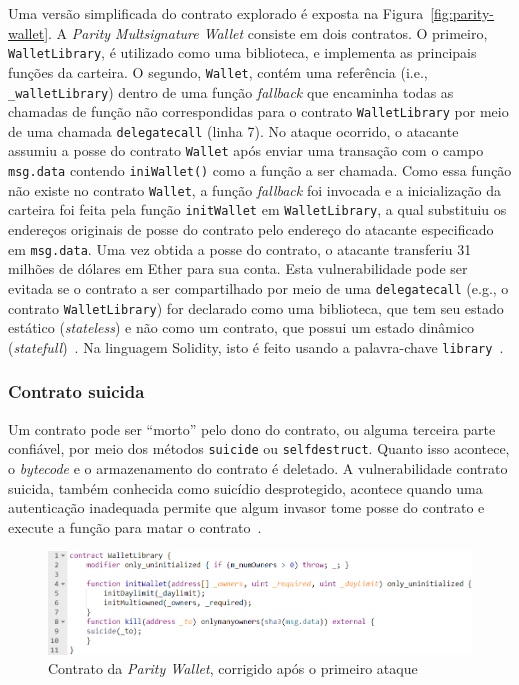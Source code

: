 Uma versão simplificada do contrato explorado é exposta na Figura~\ref{fig:parity-wallet}. A \textit{Parity Multsignature Wallet} consiste em dois contratos. O primeiro, \texttt{WalletLibrary}, é utilizado como uma biblioteca, e implementa as principais funções da carteira. O segundo, \texttt{Wallet}, contém uma referência (i.e., \texttt{\_walletLibrary}) dentro de uma função \textit{fallback} que encaminha todas as chamadas de função não correspondidas para o contrato \texttt{WalletLibrary} por meio de uma chamada \texttt{delegatecall} (linha 7). No ataque ocorrido, o atacante assumiu a posse do contrato \texttt{Wallet} após enviar uma transação com o campo \texttt{msg.data} contendo \texttt{iniWallet()} como a função a ser chamada. Como essa função não existe no contrato \texttt{Wallet}, a função \textit{fallback} foi invocada e a inicialização da carteira foi feita pela função \texttt{initWallet} em \texttt{WalletLibrary}, a qual substituiu os endereços originais de posse do contrato pelo endereço do atacante especificado em \texttt{msg.data}. Uma vez obtida a posse do contrato, o atacante transferiu 31 milhões de dólares em Ether para sua conta. Esta vulnerabilidade pode ser evitada se o contrato a ser compartilhado por meio de uma \texttt{delegatecall} (e.g., o contrato \texttt{WalletLibrary}) for declarado como uma biblioteca, que tem seu estado estático (\textit{stateless}) e não como um contrato, que possui um estado dinâmico (\textit{statefull})~\cite{chen2020survey-ethereum-acm}. Na linguagem Solidity, isto é feito usando a palavra-chave \texttt{library}~\cite{knownattacks2018}.

\subsubsection*{\textbf{Contrato suicida}}

Um contrato pode ser ``morto'' pelo dono do contrato, ou alguma terceira parte confiável, por meio dos métodos \texttt{suicide} ou \texttt{selfdestruct}. Quanto isso acontece, o \textit{bytecode} e o armazenamento do contrato é deletado. A vulnerabilidade contrato suicida, também conhecida como suicídio desprotegido, acontece quando uma autenticação inadequada permite que algum invasor tome posse do contrato e execute a função para matar o contrato~\cite{chen2020survey-ethereum-acm}. 

\begin{figure}[!htb]
 \caption{Contrato da \textit{Parity Wallet}, corrigido após o primeiro ataque}
 \label{fig:parity-corrigido}
 \centering
 \includegraphics[scale=0.65]{figuras/parity-corrigido.png}
\end{figure}

